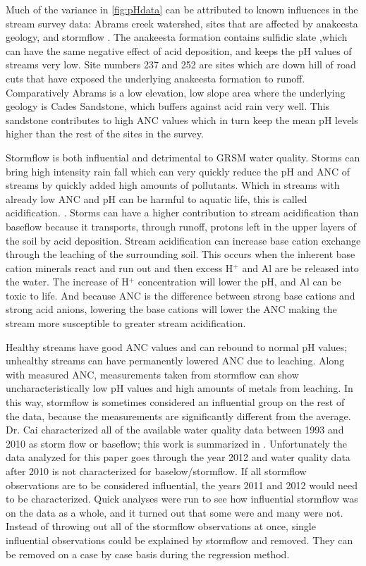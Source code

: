 Much of the variance in \autoref{fig:pHdata} can be attributed to known influences in the stream survey data: Abrams creek watershed, sites that are affected by anakeesta geology, and stormflow \citep{neff2012influence}.  
The anakeesta formation contains sulfidic slate ,which can have the same negative effect of acid deposition,  and keeps the pH values of streams very low.
Site numbers 237 and 252 are sites which are down hill of road cuts that have exposed the underlying anakeesta formation to runoff.  
Comparatively Abrams is a low elevation, low slope area where the underlying geology is Cades Sandstone, which buffers against acid rain very well. 
This sandstone contributes to high ANC values which in turn keep the mean pH levels higher than the rest of the sites in the survey. 

Stormflow is both influential and detrimental  to GRSM water quality. 
Storms can bring high intensity rain fall which can very quickly reduce the pH and ANC of streams by quickly added high amounts of pollutants. 
Which in streams with already low ANC and pH can be harmful to aquatic life, this is called acidification. \citep{neff2009physiological}.  
Storms can have a higher contribution to stream acidification than baseflow because it transports, through runoff, protons left in the upper layers of the soil by acid deposition. 
Stream acidification can increase base cation exchange through the leaching of the surrounding soil. 
This occurs when the inherent base cation minerals react and run out and then excess H$^+$ and Al are be released into the water. 
The increase of H$^+$ concentration will lower the pH, and Al can be toxic to life.
And because ANC is the difference between strong base cations and strong acid anions, lowering the base cations will lower the ANC making the stream more susceptible to greater stream acidification.

Healthy streams have good ANC values and can rebound to normal pH values; unhealthy streams can have permanently lowered ANC due to leaching.  
Along with measured ANC, measurements taken from stormflow can show uncharacteristically low pH values and high amounts of metals from leaching. 
In this way, stormflow is sometimes considered an influential group on the rest of the data, because the measurements are significantly different from the average. 
Dr. Cai characterized all of the available water quality data between 1993 and 2010 as storm flow or baseflow; this work is summarized in \citet{cai2013}. 
Unfortunately the data analyzed for this paper goes through the year 2012 and water quality data after 2010 is not characterized for baselow/stormflow. 
If all stormflow observations are to be considered influential, the years 2011 and 2012 would need to be characterized. 
Quick analyses were run to see how influential stormflow was on the data as a whole, and it turned out that some were and many were not. 
Instead of throwing out all of the stormflow observations at once, single influential observations could be explained by stormflow and removed. 
They can be removed on a case by case basis during the regression method.

